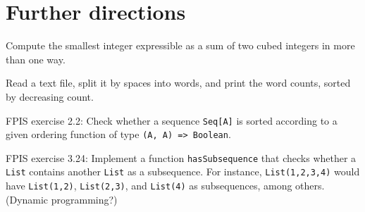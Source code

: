 
\chapter{Further directions }

Compute the smallest integer expressible as a sum of two cubed integers
in more than one way.

Read a text file, split it by spaces into words, and print the word
counts, sorted by decreasing count.

FPIS exercise 2.2: Check whether a sequence \lstinline!Seq[A]! is
sorted according to a given ordering function of type \lstinline!(A, A) => Boolean!.

FPIS exercise 3.24: Implement a function \lstinline!hasSubsequence!
that checks whether a \lstinline!List! contains another \lstinline!List!
as a subsequence. For instance, \lstinline!List(1,2,3,4)! would have
\lstinline!List(1,2)!, \lstinline!List(2,3)!, and \lstinline!List(4)!
as subsequences, among others. (Dynamic programming?)
